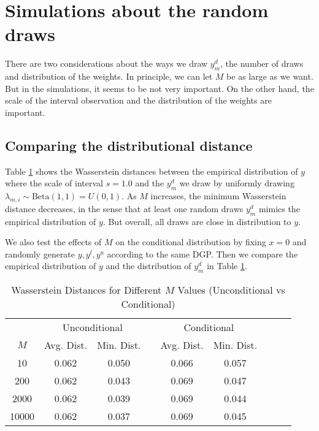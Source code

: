 \documentclass[12pt]{article}
\begin{document}
        \newpage

    \section{Simulations about the random draws }

    There are two considerations about the ways we draw \(y^{d}_{m}\), the number of draws and distribution of the weights. In principle, we can let \(M\) be as large as we want. But in the simulations, it seems to be not very important. On the other hand, the scale of the interval observation and the distribution of the weights are important. 

    \subsection{Comparing the distributional distance}
    Table \ref{tab:wasserstein-combined} shows the Wasserstein distances between the empirical distribution of \(y\) where the scale of interval \(s = 1.0\) and the \(y^{d}_{m}\) we draw by uniformly drawing \(\lambda_{m,i}\sim \text{Beta}(1,1) = U(0,1)\). As \(M\) increases, the minimum Wasserstein distance decreases, in the sense that at least one random draws \(y^{d}_{m}\) mimics the empirical distribution of \(y\). But overall, all draws are close in distribution to \(y\).

    We also test the effects of \(M\) on the conditional distribution by fixing \(x = 0\) and randomly generate \(y, y^{l}, y^{u}\) according to the same DGP. Then we compare the empirical distribution of \(y\) and the distribution of \(y^{d}_{m}\) in Table \ref{tab:wasserstein-combined}.  

    \begin{table}[htbp]
        \centering
        \begin{tabular}{ccccccccc}
            \hline
            & \multicolumn{2}{c}{Unconditional} & & \multicolumn{2}{c}{Conditional} \\
            \cline{2-3} \cline{5-6}
            \(M\) & Avg. Dist. & Min. Dist. & & Avg. Dist. & Min. Dist. \\
            \hline
            10 & 0.062 & 0.050 & & 0.066 & 0.057 \\
            200 & 0.062 & 0.043 & & 0.069 & 0.047 \\
            2000 & 0.062 & 0.039 & & 0.069 & 0.044 \\
            10000 & 0.062 & 0.037 & & 0.069 & 0.045 \\
            \hline
        \end{tabular}
        \caption{Wasserstein Distances for Different \(M\) Values (Unconditional vs Conditional)}
        \label{tab:wasserstein-combined}
    \end{table}
\end{document}
